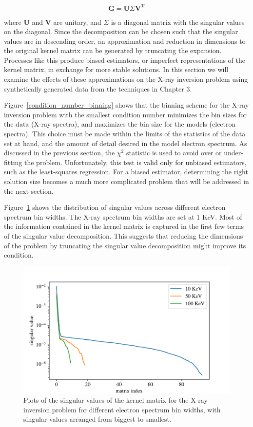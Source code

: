 $$\mathbf{G} = \mathbf{U}\Sigma\mathbf{V^T}$$

where $\mathbf{U}$ and $\mathbf{V}$ are unitary, and $\Sigma$ is a diagonal matrix with the singular values on the diagonal. Since the decomposition can be chosen such that the singular values are in descending order, an approximation and reduction in dimensions to the original kernel matrix can be generated by truncating the expansion. Processes like this produce biased estimators, or imperfect representations of the kernel matrix, in exchange for more stable solutions. In this section we will examine the effects of these approximations on the X-ray inversion problem using synthetically generated data from the techniques in Chapter 3. 

Figure~\ref{condition_number_binning} shows that the binning scheme for the X-ray inversion problem with the smallest condition number minimizes the bin sizes for the data (X-ray spectra), and maximizes the bin size for the models (electron spectra). This choice must be made within the limits of the statistics of the data set at hand, and the amount of detail desired in the model electron spectrum. As discussed in the previous section, the $\chi^2$ statistic is used to avoid over or under-fitting the problem. Unfortunately, this test is valid only for unbiased estimators, such as the least-squares regression. For a biased estimator, determining the right solution size becomes a much more complicated problem that will be addressed in the next section.

Figure~\ref{singular-value-plots} shows the distribution of singular values across different electron spectrum bin widths. The X-ray spectrum bin widths are set at 1 KeV. Most of the information contained in the kernel matrix is captured in the first few terms of the singular value decomposition. This suggests that reducing the dimensions of the problem by truncating the singular value decomposition might improve its condition.

\begin{figure}[p]
    \centering
    \includegraphics[width=\textwidth]{figures/chapter_4/singular_value_plots/fig_6.pdf}
    \caption{Plots of the singular values of the kernel matrix for the X-ray inversion problem for different electron spectrum bin widths, with singular values arranged from biggest to smallest.}
    \label{singular-value-plots}
\end{figure}

